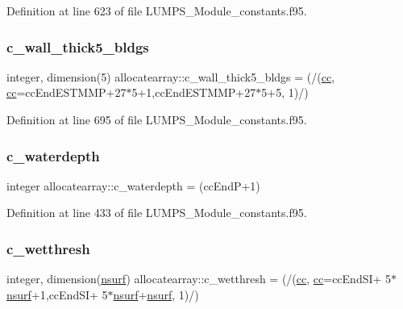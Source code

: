Definition at line 623 of file L\+U\+M\+P\+S\+\_\+\+Module\+\_\+constants.\+f95.

\mbox{\label{namespaceallocatearray_ad95655da9944167e0208bf8454674fb6}} 
\subsubsection{\texorpdfstring{c\+\_\+wall\+\_\+thick5\+\_\+bldgs}{c\_wall\_thick5\_bldgs}}
{\footnotesize\ttfamily integer, dimension(5) allocatearray\+::c\+\_\+wall\+\_\+thick5\+\_\+bldgs = (/(\hyperlink{namespaceallocatearray_ac863c81704eb507dee10f5e10741e10c}{cc}, \hyperlink{namespaceallocatearray_ac863c81704eb507dee10f5e10741e10c}{cc}=cc\+End\+E\+S\+T\+M\+MP+27$\ast$5+1,cc\+End\+E\+S\+T\+M\+MP+27$\ast$5+5, 1)/)}



Definition at line 695 of file L\+U\+M\+P\+S\+\_\+\+Module\+\_\+constants.\+f95.

\mbox{\label{namespaceallocatearray_a6a3bb31820fe8c29a52acb94877f5cae}} 
\subsubsection{\texorpdfstring{c\+\_\+waterdepth}{c\_waterdepth}}
{\footnotesize\ttfamily integer allocatearray\+::c\+\_\+waterdepth = (cc\+EndP+1)}



Definition at line 433 of file L\+U\+M\+P\+S\+\_\+\+Module\+\_\+constants.\+f95.

\mbox{\label{namespaceallocatearray_aef6324b6203130643705c7932a3c2d1a}} 
\subsubsection{\texorpdfstring{c\+\_\+wetthresh}{c\_wetthresh}}
{\footnotesize\ttfamily integer, dimension(\hyperlink{namespaceallocatearray_acd22f92a06f7e9a2a91426b3dc99fdb0}{nsurf}) allocatearray\+::c\+\_\+wetthresh = (/(\hyperlink{namespaceallocatearray_ac863c81704eb507dee10f5e10741e10c}{cc}, \hyperlink{namespaceallocatearray_ac863c81704eb507dee10f5e10741e10c}{cc}=cc\+End\+SI+ 5$\ast$\hyperlink{namespaceallocatearray_acd22f92a06f7e9a2a91426b3dc99fdb0}{nsurf}+1,cc\+End\+SI+ 5$\ast$\hyperlink{namespaceallocatearray_acd22f92a06f7e9a2a91426b3dc99fdb0}{nsurf}+\hyperlink{namespaceallocatearray_acd22f92a06f7e9a2a91426b3dc99fdb0}{nsurf}, 1)/)}



